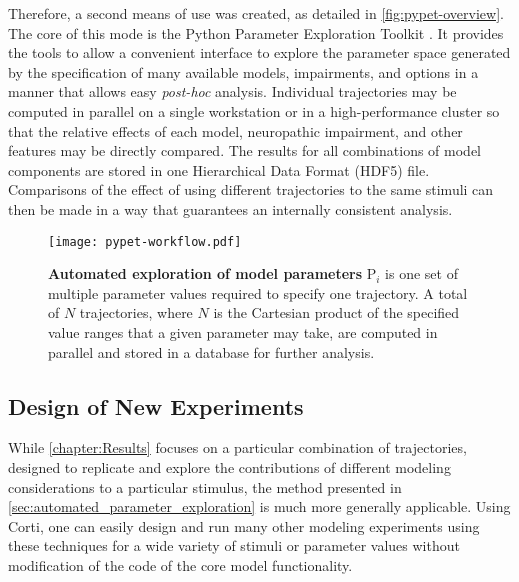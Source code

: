 Therefore, a second means of use was created, as detailed in \autoref{fig:pypet-overview}. The core of this mode is the Python Parameter Exploration Toolkit \citep{Meyer2016Pypet}. It provides the tools to allow a convenient interface to explore the parameter space generated by the specification of many available models, impairments, and options in a manner that allows easy \emph{post-hoc} analysis. Individual trajectories may be computed in parallel on a single workstation or in a high-performance cluster so that the relative effects of each model, neuropathic impairment, and other features may be directly compared.  The results for all combinations of model components are stored in one Hierarchical Data Format (HDF5) file.  Comparisons of the effect of using different trajectories to the same stimuli can then be made in a way that guarantees an internally consistent analysis.

\begin{figure}[htbp]
	\centering
	\texttt{[image: pypet-workflow.pdf]}
	\caption[Automated Exploration of Model Parameters]{\textbf{Automated exploration of model parameters} P$_i$ is one set of multiple parameter values required to specify one trajectory.  A total of $N$ trajectories, where $N$ is the Cartesian product of the specified value ranges that a given parameter may take, are computed in parallel and stored in a database for further analysis. }
	\label{fig:pypet-overview}
\end{figure}
\subsection{Design of New Experiments} %
\label{sub:design_of_new_experiments}
While \autoref{chapter:Results} focuses on a particular combination of trajectories, designed to replicate and explore the contributions of different modeling considerations to a particular stimulus, the method presented in \autoref{sec:automated_parameter_exploration} is much more generally applicable.  Using Corti, one can easily design and run many other modeling experiments using these techniques for a wide variety of stimuli or parameter values without modification of the code of the core model functionality. 
